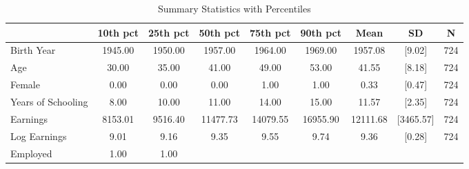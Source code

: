 \documentclass{article}
\begin{document}
\begin{table}[htbp] 
\centering 
\begin{threeparttable} 
\caption{Summary Statistics with Percentiles} 

\centering
\begin{tabular}{lllllllll}
\toprule
\multicolumn{1}{c}{} &
  \multicolumn{1}{c}{10th pct} &
  \multicolumn{1}{c}{25th pct} &
  \multicolumn{1}{c}{50th pct} &
  \multicolumn{1}{c}{75th pct} &
  \multicolumn{1}{c}{90th pct} &
  \multicolumn{1}{c}{Mean} &
  \multicolumn{1}{c}{SD} &
  \multicolumn{1}{c}{N} \\
\midrule
\multicolumn{1}{l}{Birth Year} &
  \multicolumn{1}{c}{1945.00} &
  \multicolumn{1}{c}{1950.00} &
  \multicolumn{1}{c}{1957.00} &
  \multicolumn{1}{c}{1964.00} &
  \multicolumn{1}{c}{1969.00} &
  \multicolumn{1}{c}{1957.08} &
  \multicolumn{1}{c}{[9.02]} &
  \multicolumn{1}{c}{724} \\
\multicolumn{1}{l}{Age} &
  \multicolumn{1}{c}{30.00} &
  \multicolumn{1}{c}{35.00} &
  \multicolumn{1}{c}{41.00} &
  \multicolumn{1}{c}{49.00} &
  \multicolumn{1}{c}{53.00} &
  \multicolumn{1}{c}{41.55} &
  \multicolumn{1}{c}{[8.18]} &
  \multicolumn{1}{c}{724} \\
\multicolumn{1}{l}{Female} &
  \multicolumn{1}{c}{0.00} &
  \multicolumn{1}{c}{0.00} &
  \multicolumn{1}{c}{0.00} &
  \multicolumn{1}{c}{1.00} &
  \multicolumn{1}{c}{1.00} &
  \multicolumn{1}{c}{0.33} &
  \multicolumn{1}{c}{[0.47]} &
  \multicolumn{1}{c}{724} \\
\multicolumn{1}{l}{Years of Schooling} &
  \multicolumn{1}{c}{8.00} &
  \multicolumn{1}{c}{10.00} &
  \multicolumn{1}{c}{11.00} &
  \multicolumn{1}{c}{14.00} &
  \multicolumn{1}{c}{15.00} &
  \multicolumn{1}{c}{11.57} &
  \multicolumn{1}{c}{[2.35]} &
  \multicolumn{1}{c}{724} \\
\multicolumn{1}{l}{Earnings} &
  \multicolumn{1}{c}{8153.01} &
  \multicolumn{1}{c}{9516.40} &
  \multicolumn{1}{c}{11477.73} &
  \multicolumn{1}{c}{14079.55} &
  \multicolumn{1}{c}{16955.90} &
  \multicolumn{1}{c}{12111.68} &
  \multicolumn{1}{c}{[3465.57]} &
  \multicolumn{1}{c}{724} \\
\multicolumn{1}{l}{Log Earnings} &
  \multicolumn{1}{c}{9.01} &
  \multicolumn{1}{c}{9.16} &
  \multicolumn{1}{c}{9.35} &
  \multicolumn{1}{c}{9.55} &
  \multicolumn{1}{c}{9.74} &
  \multicolumn{1}{c}{9.36} &
  \multicolumn{1}{c}{[0.28]} &
  \multicolumn{1}{c}{724} \\
\multicolumn{1}{l}{Employed} &
  \multicolumn{1}{c}{1.00} &
  \multicolumn{1}{c}{1.00} &

\end{tabular}
\end{threeparttable}
\end{table}
\end{document}
